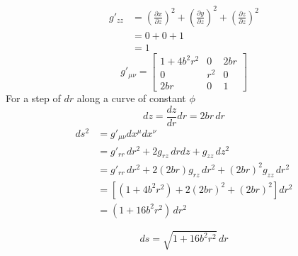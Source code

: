 \documentclass[12pt]{article}
\begin{document}
\begin{equation*}
      \begin{split}
            g'_{z z} & = {\left(\frac{\partial x}{\partial z} \right)}^2 +
            {\left(\frac{\partial y}{\partial z} \right)}^2 +
            {\left(\frac{\partial z}{\partial z} \right)}^2                \\
                     & = 0 + 0 + 1                                         \\
                     & = 1
      \end{split}
\end{equation*}
\begin{equation*}
      g'_{\mu\nu} =
      \begin{bmatrix}
            1 + 4b^2r^2 & 0   & 2br \\
            0           & r^2 & 0   \\
            2br         & 0   & 1
      \end{bmatrix}
\end{equation*}
For a step of \(dr\) along a curve of constant \(\phi\)
\[dz = \frac{dz}{dr}dr = 2br\, dr\]
\begin{equation*}
      \begin{split}
            ds^2 & = g'_{\mu \nu} dx^\mu dx^\nu                                   \\
                 & = g'_{r r}\,dr^2 + 2g_{r z}\,dr dz + g_{z z}\,dz^2             \\
                 & = g'_{r r}\,dr^2 + 2(2br)g_{r z}\,dr^2 + (2br)^2 g_{z z}\,dr^2 \\
                 & = \left[(1 + 4b^2r^2) + 2(2br)^2 + (2br)^2\right] dr^2         \\
                 & = (1+ 16 b^2r^2)\, dr^2
      \end{split}
\end{equation*}

\[
      ds = \sqrt{1+ 16 b^2r^2}\, dr
\]


\newpage



\nocite{El-Deeb_PEU-453_Assignments}
\end{document}
